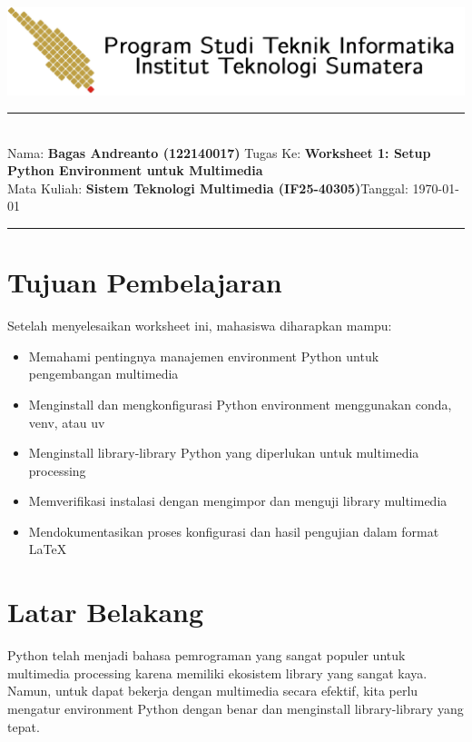 \documentclass[11pt,a4paper]{article}
\newcommand{\student}{\textbf{Bagas Andreanto (122140017)}}
\newcommand{\course}{\textbf{Sistem Teknologi Multimedia (IF25-40305)}}
\newcommand{\assignment}{\textbf{Worksheet 1: Setup Python Environment untuk Multimedia}}
\begin{document}
\thispagestyle{empty}
\begin{center}
	\includegraphics[scale = 0.15]{Figure/ifitera-header.png}
	\vspace{0.1cm}
\end{center}
\noindent
\rule{17cm}{0.2cm}\\[0.3cm]
Nama: \student \hspace{3cm} Tugas Ke: \assignment\\[0.1cm]
Mata Kuliah: \course \hfill Tanggal: \today\\
\rule{17cm}{0.05cm}
\vspace{0.1cm}



\section{Tujuan Pembelajaran}
Setelah menyelesaikan worksheet ini, mahasiswa diharapkan mampu:
\begin{itemize}
    \item Memahami pentingnya manajemen environment Python untuk pengembangan multimedia
    \item Menginstall dan mengkonfigurasi Python environment menggunakan conda, venv, atau uv
    \item Menginstall library-library Python yang diperlukan untuk multimedia processing
    \item Memverifikasi instalasi dengan mengimpor dan menguji library multimedia
    \item Mendokumentasikan proses konfigurasi dan hasil pengujian dalam format \LaTeX
\end{itemize}

\section{Latar Belakang}
Python telah menjadi bahasa pemrograman yang sangat populer untuk multimedia processing karena memiliki ekosistem library yang sangat kaya. Namun, untuk dapat bekerja dengan multimedia secara efektif, kita perlu mengatur environment Python dengan benar dan menginstall library-library yang tepat.
\end{document}
